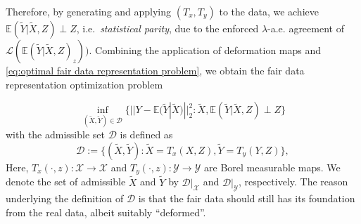 \documentclass[twoside,11pt]{article}
\begin{document}
Therefore, by generating and applying $(T_x, T_y)$ to the data, we achieve $\mathbb{E}(\tilde{Y}|\tilde{X},Z) \perp Z$, i.e.\ {\em statistical parity}, due to the enforced $\lambda$-a.e.  agreement of $\mathcal{L}(\mathbb{E}(\tilde{Y}|\tilde{X},Z)_z))$. Combining the application of deformation maps and \eqref{eq:optimal fair data representation problem}, we obtain the fair data representation optimization problem




\begin{equation}\label{bary_objective}
\inf_{(\tilde{X}, \tilde{Y}) \in \mathcal{D}} \{ ||Y - \mathbb{E}(\tilde{Y}|\tilde{X})||^2_2 : \tilde{X}, \mathbb{E}(\tilde{Y}|\tilde{X},Z) \perp Z\}
\end{equation}
with the admissible set $\mathcal{D}$ is defined as
\begin{equation}
\mathcal{D} := \{ (\tilde{X},\tilde{Y}):  \tilde{X} = T_x(X,Z) , \tilde{Y} = T_y(Y,Z) \},
\end{equation}
Here, $T_x(\cdot,z): \mathcal{X} \rightarrow \mathcal{X}$ and $T_y(\cdot,z): \mathcal{Y} \rightarrow \mathcal{Y}$ are Borel measurable maps. We denote the set of admissible $\tilde{X}$ and $\tilde{Y}$ by $\mathcal{D}|_{\mathcal{X}}$ and $\mathcal{D}|_{\mathcal{Y}}$, respectively. The reason underlying the definition of $\mathcal{D}$ is that the fair data should still has its foundation from the real data, albeit suitably ``deformed''.
\end{document}
